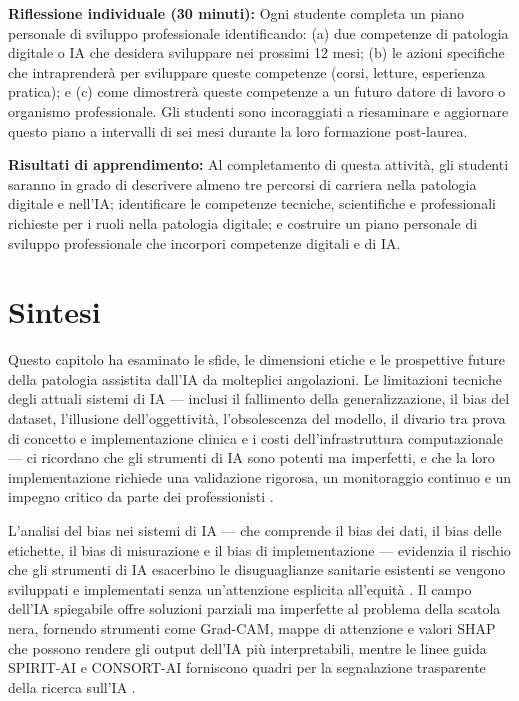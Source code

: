 \textbf{Riflessione individuale (30 minuti):} Ogni studente completa un piano personale di sviluppo professionale identificando: (a) due competenze di patologia digitale o IA che desidera sviluppare nei prossimi 12 mesi; (b) le azioni specifiche che intraprenderà per sviluppare queste competenze (corsi, letture, esperienza pratica); e (c) come dimostrerà queste competenze a un futuro datore di lavoro o organismo professionale. Gli studenti sono incoraggiati a riesaminare e aggiornare questo piano a intervalli di sei mesi durante la loro formazione post-laurea.

\textbf{Risultati di apprendimento:} Al completamento di questa attività, gli studenti saranno in grado di descrivere almeno tre percorsi di carriera nella patologia digitale e nell'IA; identificare le competenze tecniche, scientifiche e professionali richieste per i ruoli nella patologia digitale; e costruire un piano personale di sviluppo professionale che incorpori competenze digitali e di IA.

\section{Sintesi}
\label{sec:ch5_summary}

Questo capitolo ha esaminato le sfide, le dimensioni etiche e le prospettive future della patologia assistita dall'IA da molteplici angolazioni. Le limitazioni tecniche degli attuali sistemi di IA — inclusi il fallimento della generalizzazione, il bias del dataset, l'illusione dell'oggettività, l'obsolescenza del modello, il divario tra prova di concetto e implementazione clinica e i costi dell'infrastruttura computazionale — ci ricordano che gli strumenti di IA sono potenti ma imperfetti, e che la loro implementazione richiede una validazione rigorosa, un monitoraggio continuo e un impegno critico da parte dei professionisti \cite{bankhead2022,howard2021}.

L'analisi del bias nei sistemi di IA — che comprende il bias dei dati, il bias delle etichette, il bias di misurazione e il bias di implementazione — evidenzia il rischio che gli strumenti di IA esacerbino le disuguaglianze sanitarie esistenti se vengono sviluppati e implementati senza un'attenzione esplicita all'equità \cite{chen2023,seyyedkalantari2021}. Il campo dell'IA spiegabile offre soluzioni parziali ma imperfette al problema della scatola nera, fornendo strumenti come Grad-CAM, mappe di attenzione e valori SHAP che possono rendere gli output dell'IA più interpretabili, mentre le linee guida SPIRIT-AI e CONSORT-AI forniscono quadri per la segnalazione trasparente della ricerca sull'IA \cite{amann2020,cruzirivera2020}.

